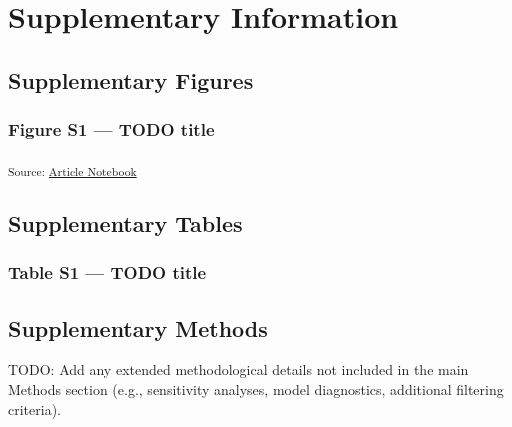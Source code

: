 \documentclass[
  12pt,
]{article}
\begin{document}
\section*{Supplementary Information}\label{supplementary-information}

\subsection{Supplementary Figures}\label{supplementary-figures}

\subsubsection*{Figure S1 --- TODO title}\label{figure-s1-todo-title}

\protect{}\label{cell-fig-s1}
\textsubscript{Source:
\href{https://OndrejMottl.github.io/BIODYNAMICS-vegetation-cooccurrence/manuscript.qmd.html}{Article
Notebook}}

\subsection{Supplementary Tables}\label{supplementary-tables}

\subsubsection*{Table S1 --- TODO title}\label{table-s1-todo-title}

\subsection{Supplementary Methods}\label{supplementary-methods}

TODO: Add any extended methodological details not included in the main
Methods section (e.g., sensitivity analyses, model diagnostics,
additional filtering criteria).
\end{document}
